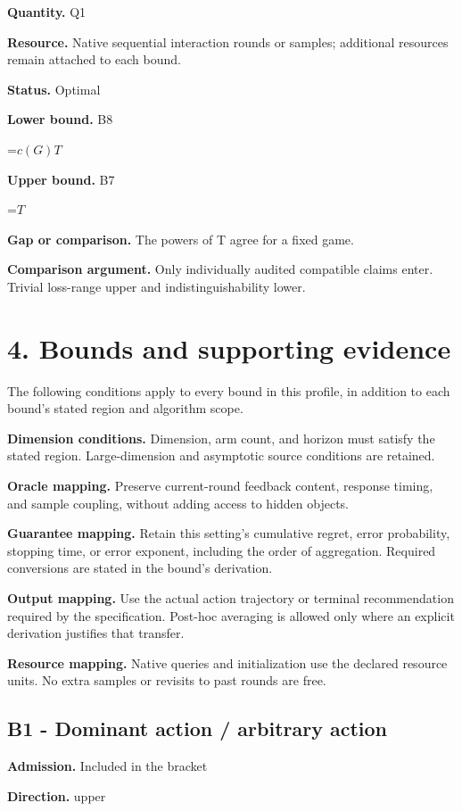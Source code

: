 \documentclass[10pt,a4paper]{article}
\newcommand{\AtlasMath}[1]{\par\begingroup\centering\setbox0=\hbox{$\displaystyle #1$}\ifdim\wd0>1.4\linewidth\typeout{ATLAS WIDE FORMULA: \the\wd0}\fi\ifdim\wd0>\linewidth\resizebox{\linewidth}{!}{\box0}\else\box0\fi\par\endgroup}
\begin{document}
\textbf{Quantity.} Q1

\textbf{Resource.} Native sequential interaction rounds or samples; additional resources remain attached to each bound.

\textbf{Status.} Optimal

\textbf{Lower bound.} B8

\AtlasMath{c(G)T}
\textbf{Upper bound.} B7

\AtlasMath{T}
\textbf{Gap or comparison.} The powers of T agree for a fixed game.

\textbf{Comparison argument.} Only individually audited compatible claims enter. Trivial loss-range upper and indistinguishability lower.

\section{4. Bounds and supporting evidence}
The following conditions apply to every bound in this profile, in addition to each bound's stated region and algorithm scope.

\textbf{Dimension conditions.} Dimension, arm count, and horizon must satisfy the stated region. Large-dimension and asymptotic source conditions are retained.

\textbf{Oracle mapping.} Preserve current-round feedback content, response timing, and sample coupling, without adding access to hidden objects.

\textbf{Guarantee mapping.} Retain this setting's cumulative regret, error probability, stopping time, or error exponent, including the order of aggregation. Required conversions are stated in the bound's derivation.

\textbf{Output mapping.} Use the actual action trajectory or terminal recommendation required by the specification. Post-hoc averaging is allowed only where an explicit derivation justifies that transfer.

\textbf{Resource mapping.} Native queries and initialization use the declared resource units. No extra samples or revisits to past rounds are free.

\subsection{B1 - Dominant action / arbitrary action}
\textbf{Admission.} Included in the bracket

\textbf{Direction.} upper
\end{document}
